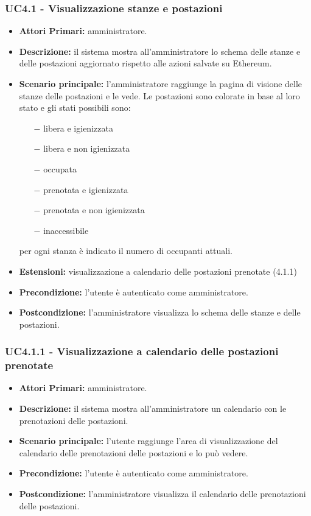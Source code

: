 \subsubsection{ UC4.1 - Visualizzazione stanze e postazioni}
\begin{itemize}
	\item\textbf{Attori Primari:}
	amministratore.
	\item\textbf{Descrizione:}
	il sistema mostra all'amministratore lo schema delle stanze e delle postazioni aggiornato rispetto alle azioni salvate su Ethereum.
	\item\textbf{Scenario principale:}
	l'amministratore raggiunge la pagina di visione delle stanze delle postazioni e le vede. Le postazioni sono colorate in base al loro stato e gli stati possibili sono:
	\begin{itemize}
		\item[$-$] libera e igienizzata
		\item[$-$] libera e non igienizzata
		\item[$-$] occupata
		\item[$-$] prenotata e igienizzata
		\item[$-$] prenotata e non igienizzata
		\item[$-$] inaccessibile
	\end{itemize}
	per ogni stanza è indicato il numero di occupanti attuali.
	\item\textbf{Estensioni:}
	visualizzazione a calendario delle postazioni prenotate (4.1.1)
	\item\textbf{Precondizione:} 
	l'utente è autenticato come amministratore.
	\item\textbf{Postcondizione:}
	l'amministratore visualizza lo schema delle stanze e delle postazioni.
\end{itemize}

\subsubsection{ UC4.1.1 - Visualizzazione a calendario delle postazioni prenotate}
\begin{itemize}
	\item\textbf{Attori Primari:}
	amministratore.
	\item\textbf{Descrizione:}
	il sistema mostra all'amministratore un calendario con le prenotazioni delle postazioni.
	\item\textbf{Scenario principale:}
	l'utente raggiunge l'area di visualizzazione del calendario delle prenotazioni delle postazioni e lo può vedere.
	\item\textbf{Precondizione:} 
	l'utente è autenticato come amministratore.
	\item\textbf{Postcondizione:}
	l'amministratore visualizza il calendario delle prenotazioni delle postazioni.
\end{itemize}


